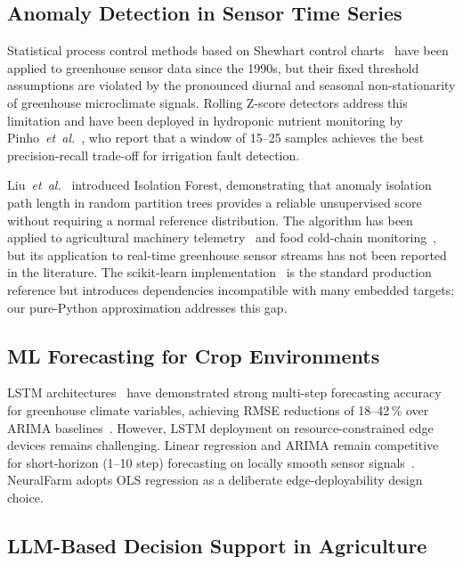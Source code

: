 \documentclass[journal,10pt,twocolumn]{IEEEtran}
\begin{document}
\subsection{Anomaly Detection in Sensor Time Series}

Statistical process control methods based on Shewhart control
charts~\cite{Montgomery2020} have been applied to greenhouse sensor data
since the 1990s, but their fixed threshold assumptions are violated by
the pronounced diurnal and seasonal non-stationarity of greenhouse
microclimate signals.
Rolling Z-score detectors address this limitation and have been deployed
in hydroponic nutrient monitoring by Pinho~\textit{et~al.}~\cite{Pinho2020},
who report that a window of 15--25 samples achieves the best
precision-recall trade-off for irrigation fault detection.

Liu~\textit{et~al.}~\cite{Liu2008} introduced Isolation Forest,
demonstrating that anomaly isolation path length in random partition trees
provides a reliable unsupervised score without requiring a normal reference
distribution.
The algorithm has been applied to agricultural machinery
telemetry~\cite{Zhang2019} and food cold-chain
monitoring~\cite{James2022}, but its application to real-time greenhouse
sensor streams has not been reported in the literature.
The scikit-learn implementation~\cite{Pedregosa2011} is the standard
production reference but introduces dependencies incompatible with many
embedded targets; our pure-Python approximation addresses this gap.

\subsection{ML Forecasting for Crop Environments}

LSTM architectures~\cite{Hochreiter1997} have demonstrated strong
multi-step forecasting accuracy for greenhouse climate variables,
achieving RMSE reductions of 18--42\,\% over ARIMA
baselines~\cite{Ferreira2012}.
However, LSTM deployment on resource-constrained edge devices remains
challenging.
Linear regression and ARIMA remain competitive for short-horizon
(1--10 step) forecasting on locally smooth sensor
signals~\cite{Akaike1974}.
NeuralFarm adopts OLS regression as a deliberate edge-deployability
design choice.

\subsection{LLM-Based Decision Support in Agriculture}
\end{document}
